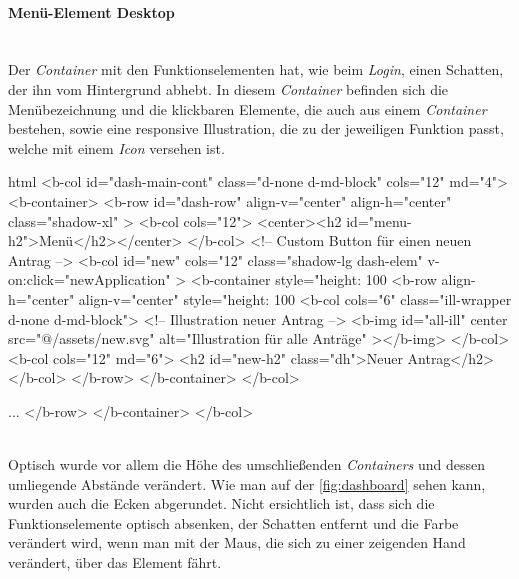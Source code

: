 \paragraph{Menü-Element Desktop}
~\\
Der \textit{Container} mit den Funktionselementen hat, wie beim \textit{Login}, einen Schatten, der ihn vom Hintergrund abhebt. In diesem \textit{Container} befinden sich die Menübezeichnung und die klickbaren Elemente, die auch aus einem \textit{Container} bestehen, sowie eine responsive Illustration, die zu der jeweiligen Funktion passt, welche mit einem \textit{Icon} versehen ist. 
\begin{code}{html}
<b-col id="dash-main-cont" class="d-none d-md-block" cols="12" md="4">
	<b-container>
		<b-row
			id="dash-row"
			align-v="center"
			align-h="center"
			class="shadow-xl"
		>
			<b-col cols="12">
				<center><h2 id="menu-h2">Menü</h2></center>
			</b-col>
			<!-- Custom Button für einen neuen Antrag -->
			<b-col
				id="new"
				cols="12"
				class="shadow-lg dash-elem"
				v-on:click="newApplication"
			>
				<b-container style="height: 100%
					<b-row align-h="center" align-v="center" style="height: 100%
						<b-col cols="6" class="ill-wrapper d-none d-md-block">
						<!-- Illustration neuer Antrag -->
							<b-img
								id="all-ill"
								center
								src="@/assets/new.svg"
								alt="Illustration für alle Anträge"
							></b-img>
						</b-col>
						<b-col cols="12" md="6">
							<h2 id="new-h2" class="dh">Neuer Antrag</h2>
						</b-col>
					</b-row>
				</b-container>
			</b-col>
			
			...
		</b-row>
	</b-container>
</b-col>
\end{code}
	\label{list:menuhtml} ~\\
Optisch wurde vor allem die Höhe des umschließenden \textit{Containers} und dessen umliegende Abstände verändert. Wie man auf der \autoref{fig:dashboard} sehen kann, wurden auch die Ecken abgerundet. Nicht ersichtlich ist, dass sich die Funktionselemente optisch absenken, der Schatten entfernt und die Farbe verändert wird, wenn man mit der Maus, die sich zu einer zeigenden Hand verändert, über das Element fährt. 
	\label{list:cssmenu}

